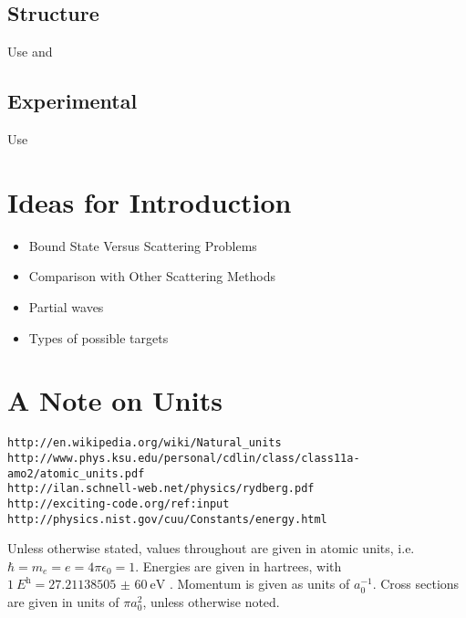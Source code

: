 \documentclass[Introduction.tex]{subfiles}
\begin{document}
\subsection{Structure}
Use \cite{Heyrovska2011} and \cite{Saito2000}




\subsection{Experimental}
Use \cite{Schrader1992}


\section{Ideas for Introduction}

\begin{itemize}
	\item Bound State Versus Scattering Problems
	\item Comparison with Other Scattering Methods
	\item Partial waves
	\item Types of possible targets
\end{itemize}



\section{A Note on Units}
\label{sec:Units}

\begin{verbatim}
http://en.wikipedia.org/wiki/Natural_units
http://www.phys.ksu.edu/personal/cdlin/class/class11a-amo2/atomic_units.pdf
http://ilan.schnell-web.net/physics/rydberg.pdf
http://exciting-code.org/ref:input
http://physics.nist.gov/cuu/Constants/energy.html
\end{verbatim}


Unless otherwise stated, values throughout are given in atomic units, i.e. $\hbar = m_e = e = 4\pi\epsilon_0 = 1$. Energies are given in hartrees, with $\SI{1}{\hartree} = \SI{27.211 385 05(60)}{\electronvolt}$ \cite{Mohr2012,NISTConversions}. Momentum is given as units of $a_0^{-1}$. Cross sections are given in units of $\pi a_0^2$, unless otherwise noted.
\end{document}
